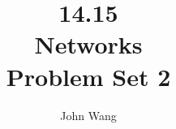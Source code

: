 \documentclass[psamsfonts]{amsart}
\title{14.15 \\
Networks \\
Problem Set 2}
\author{John Wang}
\newenvironment{prob}{{\bfseries Problem:}}
\begin{document}
\maketitle

Collaborators: Ryan Liu

\section{Problem 1}

\begin{prob}
  Let the directed graph $G$ be a ring: node $i$ is connected to $i + 1$ if $i < m$ and $m$ is connected to 1. Compute both eigenvalue centrality and Katz centrality (with $\beta = 1$). Comment on your result.

  Do the same for a $k$-regular undirected network (i.e., an undirected network in which every vertex has degree $k$). You may find the steps outlined in Newman Problem 7.1 helpful. Comment on your result.
\end{prob}
\end{document}
